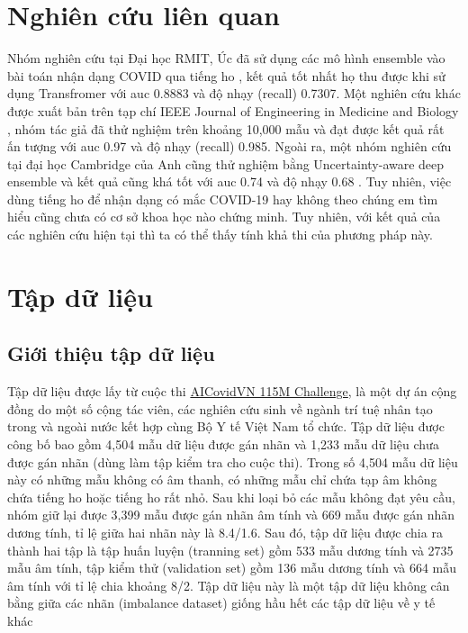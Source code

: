 \documentclass[a4paper, 12pt]{article}
\begin{document}
\noindent
\section{Nghiên cứu liên quan}
Nhóm nghiên cứu tại Đại học RMIT, Úc đã sử dụng các mô hình ensemble vào bài toán nhận dạng COVID qua tiếng ho \cite{DBLP:journals/corr/abs-2105-07566}, kết quả tốt nhất họ thu được khi sử dụng Transfromer với auc 0.8883 và độ nhạy (recall) 0.7307. Một nghiên cứu khác được xuất bản trên tạp chí IEEE Journal of Engineering in Medicine and Biology \cite{9208795}, nhóm tác giả đã thử nghiệm trên khoảng 10,000 mẫu và đạt được kết quả rất ấn tượng với auc 0.97 và độ nhạy (recall) 0.985. Ngoài ra, một nhóm nghiên cứu tại đại học Cambridge của Anh cũng thử nghiệm bằng Uncertainty-aware deep ensemble và kết quả cũng khá tốt với auc 0.74 và độ nhạy 0.68 \cite{DBLP:journals/corr/abs-2104-02005}. Tuy nhiên, việc dùng tiếng ho để nhận dạng có mắc COVID-19 hay không theo chúng em tìm hiểu cũng chưa có cơ sở khoa học nào chứng minh. Tuy nhiên, với kết quả của các nghiên cứu hiện tại thì ta có thể thấy tính khả thi của phương pháp này.


\section{Tập dữ liệu}
\subsection{Giới thiệu tập dữ liệu}
Tập dữ liệu được lấy từ cuộc thi \href{https://www.covid.aihub.vn/}{AICovidVN 115M Challenge}, là một dự án cộng đồng do một số cộng tác viên, các nghiên cứu sinh về ngành trí tuệ nhân tạo trong và ngoài nước kết hợp cùng Bộ Y tế Việt Nam tổ chức. Tập dữ liệu được công bố bao gồm 4,504 mẫu dữ liệu được gán nhãn và 1,233 mẫu dữ liệu chưa được gán nhãn (dùng làm tập kiểm tra cho cuộc thi). Trong số 4,504 mẫu dữ liệu này có những mẫu không có âm thanh, có những mẫu chỉ chứa tạp âm không chứa tiếng ho hoặc tiếng ho rất nhỏ. Sau khi loại bỏ các mẫu không đạt yêu cầu, nhóm giữ lại được 3,399 mẫu được gán nhãn âm tính và 669 mẫu được gán nhãn dương tính, tỉ lệ giữa hai nhãn này là 8.4/1.6. Sau đó, tập dữ liệu được chia ra thành hai tập là tập huấn luyện (tranning set) gồm 533 mẫu dương tính và 2735 mẫu âm tính, tập kiểm thử (validation set) gồm 136 mẫu dương tính và 664 mẫu âm tính với tỉ lệ chia khoảng 8/2. Tập dữ liệu này là một tập dữ liệu không cân bằng giữa các nhãn (imbalance dataset) giống hầu hết các tập dữ liệu về y tế khác
\end{document}
